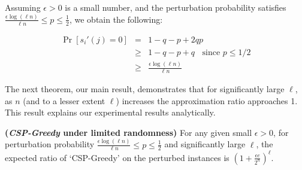 Assuming $\epsilon >0$ is a small number, and the perturbation probability satisfies $\frac{\epsilon \log ( \ell n)}{ \ell n } \leq p \leq \frac{1}{2}$, we obtain the following:

\begin{eqnarray}\label{prob_of_zero}
\Pr[s_i'(j) = 0] 	& = & 1 - q - p + 2qp \\
						& \geq & 1 - q -  p  + q \; \;  \mbox{      since $p \leq 1/2$} \\
						& \geq & \frac{\epsilon \log (\ell n)}{\ell n} 
\end{eqnarray} 

The next theorem, our main result, demonstrates that for significantly large $\ell$, as $n$ (and to a lesser extent $\ell$) increases the approximation ratio approaches 1.  This result explains our experimental results analytically.   

\begin{theorem} \label{main_theorem}  {\bf ({\em CSP-Greedy} under limited randomness)}  For any given small $\epsilon >0$, for perturbation probability $\frac{\epsilon \log ( \ell n )}{ \ell n} \leq p \leq \frac{1}{2}$ and significantly large $\ell$, the expected ratio of  `CSP-Greedy' on the perturbed instances is $\left( 1  + \frac{\epsilon e}{2^{n}} \right)^{\ell} $. \end{theorem}

